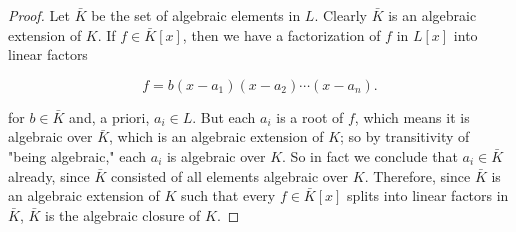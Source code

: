 \documentclass{amsart}
\begin{document}
\begin{proof}
Let $ \bar{K}$ be the set of algebraic elements in $ L$. Clearly $ \bar{K}$ is an algebraic extension of $ K$. If $ f \in \bar{K}[x]$, then we have a factorization of $ f$ in $ L[x]$ into linear factors

\[ f = b(x - a_1)(x - a_2) \dotsb (x - a_n). \]

for $ b \in \bar{K}$ and, a priori, $ a_i \in L$. But each $ a_i$ is a root of $ f$, which means it is algebraic over $ \bar{K}$, which is an algebraic extension of $ K$; so by transitivity of "being algebraic," each $ a_i$ is algebraic over $ K$. So in fact we conclude that $ a_i \in \bar{K}$ already, since $ \bar{K}$ consisted of all elements algebraic over $ K$. Therefore, since $ \bar{K}$ is an algebraic extension of $ K$ such that every $ f \in \bar{K}[x]$ splits into linear factors in $ \bar{K}$, $ \bar{K}$ is the algebraic closure of $ K$.

\end{proof}
\end{document}
